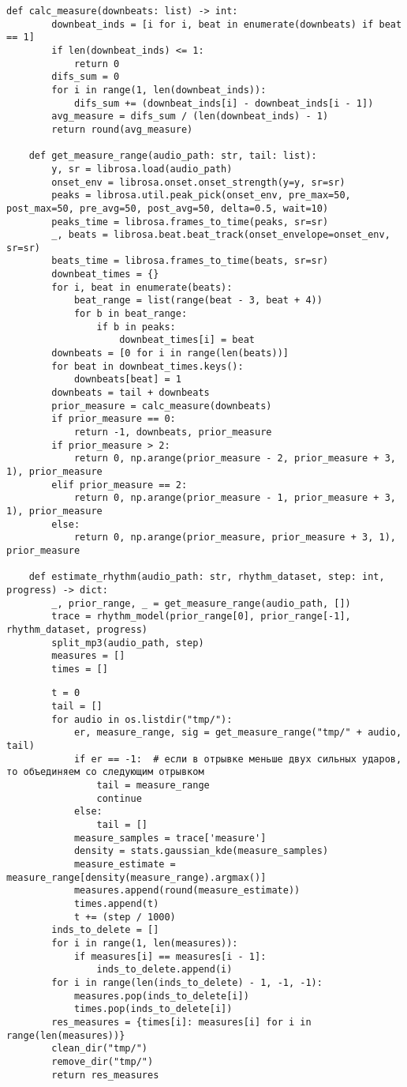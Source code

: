 \begin{lstlisting}[caption={модуль оценки темпа и ритма}]
	def calc_measure(downbeats: list) -> int:
		downbeat_inds = [i for i, beat in enumerate(downbeats) if beat == 1]
		if len(downbeat_inds) <= 1:
			return 0
		difs_sum = 0
		for i in range(1, len(downbeat_inds)):
			difs_sum += (downbeat_inds[i] - downbeat_inds[i - 1])
		avg_measure = difs_sum / (len(downbeat_inds) - 1)
		return round(avg_measure)
	
	def get_measure_range(audio_path: str, tail: list):
		y, sr = librosa.load(audio_path)
		onset_env = librosa.onset.onset_strength(y=y, sr=sr)
		peaks = librosa.util.peak_pick(onset_env, pre_max=50, post_max=50, pre_avg=50, post_avg=50, delta=0.5, wait=10)
		peaks_time = librosa.frames_to_time(peaks, sr=sr)
		_, beats = librosa.beat.beat_track(onset_envelope=onset_env, sr=sr)
		beats_time = librosa.frames_to_time(beats, sr=sr)
		downbeat_times = {}
		for i, beat in enumerate(beats):
			beat_range = list(range(beat - 3, beat + 4))
			for b in beat_range:
				if b in peaks:
					downbeat_times[i] = beat
		downbeats = [0 for i in range(len(beats))]
		for beat in downbeat_times.keys():
			downbeats[beat] = 1
		downbeats = tail + downbeats
		prior_measure = calc_measure(downbeats)
		if prior_measure == 0:
			return -1, downbeats, prior_measure
		if prior_measure > 2:
			return 0, np.arange(prior_measure - 2, prior_measure + 3, 1), prior_measure
		elif prior_measure == 2:
			return 0, np.arange(prior_measure - 1, prior_measure + 3, 1), prior_measure
		else:
			return 0, np.arange(prior_measure, prior_measure + 3, 1), prior_measure
	
	def estimate_rhythm(audio_path: str, rhythm_dataset, step: int, progress) -> dict:
		_, prior_range, _ = get_measure_range(audio_path, [])
		trace = rhythm_model(prior_range[0], prior_range[-1], rhythm_dataset, progress)
		split_mp3(audio_path, step)
		measures = []
		times = []
\end{lstlisting}

\begin{lstlisting}
		t = 0
		tail = []
		for audio in os.listdir("tmp/"):
			er, measure_range, sig = get_measure_range("tmp/" + audio, tail)
			if er == -1:  # если в отрывке меньше двух сильных ударов, то объединяем со следующим отрывком
				tail = measure_range
				continue
			else:
				tail = []
			measure_samples = trace['measure']
			density = stats.gaussian_kde(measure_samples)
			measure_estimate = measure_range[density(measure_range).argmax()]
			measures.append(round(measure_estimate))
			times.append(t)
			t += (step / 1000)
		inds_to_delete = []
		for i in range(1, len(measures)):
			if measures[i] == measures[i - 1]:
				inds_to_delete.append(i)
		for i in range(len(inds_to_delete) - 1, -1, -1):
			measures.pop(inds_to_delete[i])
			times.pop(inds_to_delete[i])
		res_measures = {times[i]: measures[i] for i in range(len(measures))}
		clean_dir("tmp/")
		remove_dir("tmp/")
		return res_measures
\end{lstlisting}

